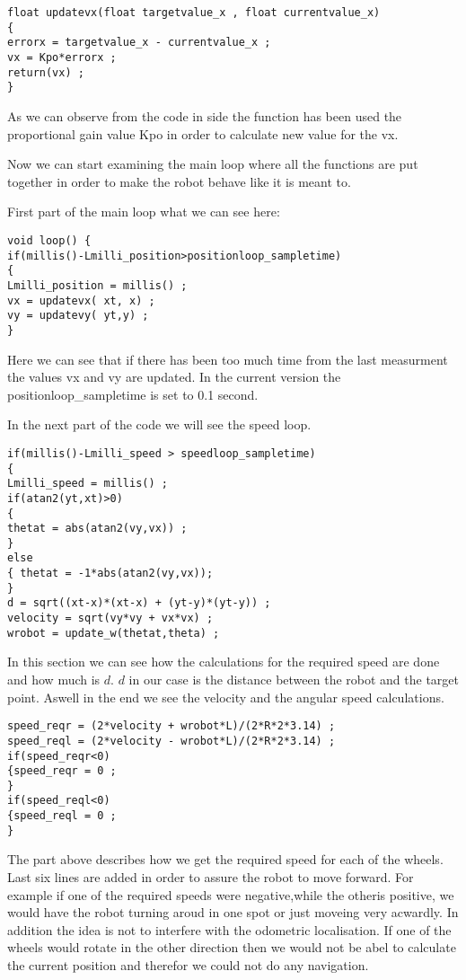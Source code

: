\begin{lstlisting}
float updatevx(float targetvalue_x , float currentvalue_x)
{
errorx = targetvalue_x - currentvalue_x ;
vx = Kpo*errorx ;
return(vx) ;
}
\end{lstlisting}

As we can observe from the code in side the function has been used the proportional gain value Kpo in order to calculate new value for the vx.

Now we can start examining the main loop where all the functions are put together in order to make the robot behave like it is meant to.

First part of the main loop what we can see here:
\begin{lstlisting}
void loop() {
if(millis()-Lmilli_position>positionloop_sampletime)
{
Lmilli_position = millis() ;
vx = updatevx( xt, x) ;
vy = updatevy( yt,y) ;
}
\end{lstlisting}

Here we can see that if there has been too much time from the last measurment the values vx and vy are updated. In the current version the positionloop_sampletime is set to 0.1 second.

In the next part of the code we will see the speed loop.
\begin{lstlisting}
if(millis()-Lmilli_speed > speedloop_sampletime)
{
Lmilli_speed = millis() ;
if(atan2(yt,xt)>0)
{
thetat = abs(atan2(vy,vx)) ;
}
else
{ thetat = -1*abs(atan2(vy,vx));
}
d = sqrt((xt-x)*(xt-x) + (yt-y)*(yt-y)) ;
velocity = sqrt(vy*vy + vx*vx) ;
wrobot = update_w(thetat,theta) ;
\end{lstlisting}

In this section we can see how the calculations for the required speed are done and how much is $d$. $d$ in our case is the distance between the robot and the target point. Aswell in the end we see the velocity and the angular speed calculations.

\begin{lstlisting}
speed_reqr = (2*velocity + wrobot*L)/(2*R*2*3.14) ;
speed_reql = (2*velocity - wrobot*L)/(2*R*2*3.14) ;
if(speed_reqr<0)
{speed_reqr = 0 ;
}
if(speed_reql<0)
{speed_reql = 0 ;
}
\end{lstlisting}

The part above describes how we get the required speed for each of the wheels. Last six lines are added in order to assure the robot to move forward. For example if one of the required speeds were negative,while the otheris positive, we would have the robot turning aroud in one spot or just moveing very acwardly. In addition the idea is not to interfere with the odometric localisation. If one of the wheels would rotate in the other direction then we would not be abel to calculate the current position and therefor we could not do any navigation.

